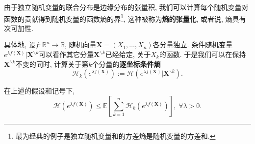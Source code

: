 由于独立随机变量的联合分布是边缘分布的张量积, 我们可以计算每个随机变量对函数的贡献得到随机变量的函数熵的界\footnote{最为经典的例子是独立随机变量和的方差熵是随机变量的方差和.}, 这种被称为\textbf{熵的张量化}, 或者说, 熵具有次可加性. 


具体地, 设$f \colon \mathbb{R}^n \to \mathbb{R}$, 随机向量$\bm{X} = (X_1, \dots, X_n)$各分量独立. 
条件随机变量$e^{\lambda f(\bm{X})} | \bm{X}^{\backslash k}$可以看作其它分量$\bm{X}^{\backslash k}$已经给定, 关于$X_k$的函数. 
于是我们可以在保持$\bm{X}^{\backslash k}$不变的同时, 计算关于第$k$个分量的\textbf{逐坐标条件熵}
\begin{equation*}
	\mathcal{H}_k ( e^{\lambda f(\bm{X})} )
	:= \mathcal{H} ( e^{\lambda f(\bm{X})} | \bm{X}^{\backslash k} ). 
\end{equation*}

\begin{lemma}[熵的张量化]\label{lemma:EntropyTensorization}
	在上述的假设和记号下, 
	\begin{equation*}
		\mathcal{H}(e^{\lambda f(\bm{X})})
		\leq \mathbb{E}\left[ \sum_{k=1}^n \mathcal{H}_k (e^{\lambda f(\bm{X})}) \right],\; 
		\forall \lambda > 0. 
	\end{equation*}
\end{lemma}
